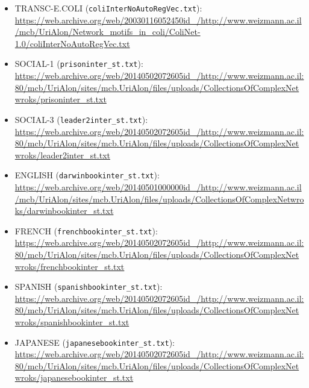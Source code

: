 \documentclass[11pt]{article}
\begin{document}
\begin{itemize}
  \item TRANSC-E.COLI (\texttt{coliInterNoAutoRegVec.txt}): \url{https://web.archive.org/web/20030116052450id_/http://www.weizmann.ac.il/mcb/UriAlon/Network_motifs_in_coli/ColiNet-1.0/coliInterNoAutoRegVec.txt}
  \item SOCIAL-1 (\texttt{prisoninter\_st.txt}): \url{https://web.archive.org/web/20140502072605id_/http://www.weizmann.ac.il:80/mcb/UriAlon/sites/mcb.UriAlon/files/uploads/CollectionsOfComplexNetwroks/prisoninter_st.txt}
  \item SOCIAL-3 (\texttt{leader2inter\_st.txt}): \url{https://web.archive.org/web/20140502072605id_/http://www.weizmann.ac.il:80/mcb/UriAlon/sites/mcb.UriAlon/files/uploads/CollectionsOfComplexNetwroks/leader2inter_st.txt}
  \item ENGLISH (\texttt{darwinbookinter\_st.txt}): \url{https://web.archive.org/web/20140501000000id_/http://www.weizmann.ac.il/mcb/UriAlon/sites/mcb.UriAlon/files/uploads/CollectionsOfComplexNetwroks/darwinbookinter_st.txt}
  \item FRENCH (\texttt{frenchbookinter\_st.txt}): \url{https://web.archive.org/web/20140502072605id_/http://www.weizmann.ac.il:80/mcb/UriAlon/sites/mcb.UriAlon/files/uploads/CollectionsOfComplexNetwroks/frenchbookinter_st.txt}
  \item SPANISH (\texttt{spanishbookinter\_st.txt}): \url{https://web.archive.org/web/20140502072605id_/http://www.weizmann.ac.il:80/mcb/UriAlon/sites/mcb.UriAlon/files/uploads/CollectionsOfComplexNetwroks/spanishbookinter_st.txt}
  \item JAPANESE (\texttt{japanesebookinter\_st.txt}): \url{https://web.archive.org/web/20140502072605id_/http://www.weizmann.ac.il:80/mcb/UriAlon/sites/mcb.UriAlon/files/uploads/CollectionsOfComplexNetwroks/japanesebookinter_st.txt}
\end{itemize}
\end{document}
